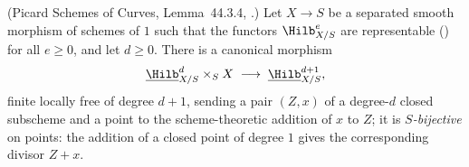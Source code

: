 \begin{lemma}
\label{lem:pc-hilb-addition}
(Picard Schemes of Curves, Lemma~44.3.4,
.)  Let $X\to S$ be
a separated smooth morphism of schemes of
 $1$ such
that the functors $\Hilb^e_{X/S}$ are representable
() for all $e\geq0$, and let
$d\geq0$.  There is a canonical morphism
\[
\underline{\Hilb}^d_{X/S}\times_SX\;\longrightarrow\;\underline{\Hilb}^{d+1}_{X/S},
\]
finite locally free of degree $d+1$, sending a pair
$(Z,x)$ of a degree-$d$ closed subscheme and a point to the
scheme-theoretic addition of $x$ to $Z$; it is
\emph{$S$-bijective} on points: the addition of a closed point of degree
$1$ gives the corresponding divisor $Z+x$.
\end{lemma}
